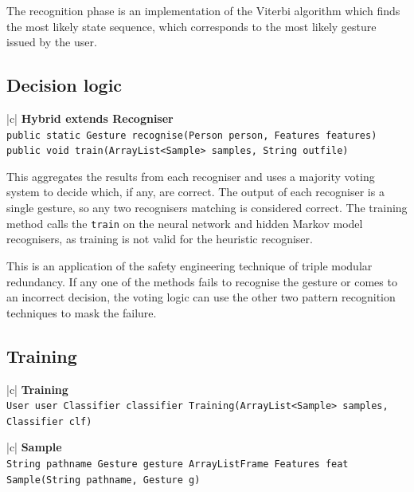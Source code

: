 \documentclass[12pt,a4,notitlepage]{report}
\renewcommand{\_}{\texttt{\symbol{95}}}
\newcommand{\<}{\texttt{\symbol{60}}}
\renewcommand{\>}{\texttt{\symbol{62}}}
\newcommand{\class}[1]{\textbf{#1}}
\newcommand{\variable}[1]{\texttt{#1}}
\begin{document}
The recognition phase is an implementation of the Viterbi algorithm which finds the most likely state sequence, which corresponds to the most likely gesture issued by the user.

\newpage

\subsection{Decision logic}

\begin{tabular}{|c|} \hline 
\class{Hybrid extends Recogniser} \\ \hline
{}
{ \variable{public static Gesture recognise(Person person, Features features) \newline
public void train(ArrayList<Sample> samples, String out\_file)
} } \\ \hline
\end{tabular}

This aggregates the results from each recogniser and uses a majority voting system to decide which, if any, are correct. The output of each recogniser is a single gesture, so any two recognisers matching is considered correct. The training method calls the \variable{train} on the neural network and hidden Markov model recognisers, as training is not valid for the heuristic recogniser.

This is an application of the safety engineering technique of triple modular redundancy. If any one of the methods fails to recognise the gesture or comes to an incorrect decision, the voting logic can use the other two pattern recognition techniques to mask the failure.

\subsection{Training}

\begin{tabular}{|c|} \hline 
\class{Training} \\ \hline
{}
{\variable{User user \newline
Classifier classifier \newline
Training(ArrayList<Sample> samples, Classifier clf)
} } \\ \hline
\end{tabular}

\begin{tabular}{|c|} \hline 
\class{Sample} \\ \hline
{}
{\variable{String pathname \newline
Gesture gesture \newline
ArrayList\<Frame\> \newline
Features feat \newline
Sample(String pathname, Gesture g)
} } \\ \hline
\end{tabular}
\end{document}
